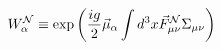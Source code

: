 \begin{equation}
\label{Wa}
W_\alpha^{\cal N}\equiv\exp\left(\frac{ig}{2}\vec\mu_\alpha\int d^3x\vec F_{\mu\nu}^{\cal N}\Sigma_{\mu\nu}\right)
\end{equation}


